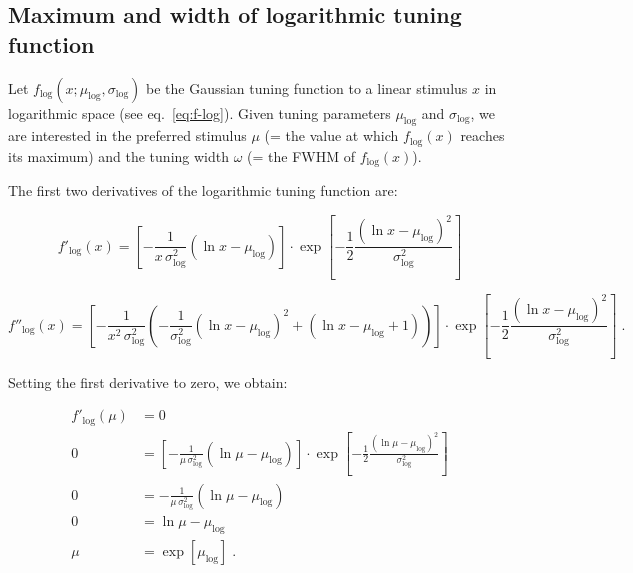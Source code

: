 \documentclass[a4paper,12pt]{article}
\begin{document}
\setcounter{equation}{0}
\subsection{Maximum and width of logarithmic tuning function} \label{sec:App-A}

Let $f_\mathrm{log}(x; \mu_\mathrm{log}, \sigma_\mathrm{log})$ be the Gaussian tuning function to a linear stimulus $x$ in logarithmic space (see eq.~\ref{eq:f-log}). Given tuning parameters $\mu_\mathrm{log}$ and $\sigma_\mathrm{log}$, we are interested in the preferred stimulus $\mu$ (= the value at which $f_\mathrm{log}(x)$ reaches its maximum) and the tuning width $\omega$ (= the FWHM of  $f_\mathrm{log}(x)$).

The first two derivatives of the logarithmic tuning function are:

\begin{equation} \label{eq:df-log}
f'_\mathrm{log}(x) = \left[ -\frac{1}{x \, \sigma_\mathrm{log}^2} (\ln x - \mu_\mathrm{log}) \right] \cdot \exp \left[ -\frac{1}{2} \frac{(\ln x - \mu_\mathrm{log})^2}{\sigma_\mathrm{log}^2} \right]
\end{equation}

\begin{equation} \label{eq:d2f-log}
f''_\mathrm{log}(x) = \left[ -\frac{1}{x^2 \, \sigma_\mathrm{log}^2} \left( -\frac{1}{\sigma_\mathrm{log}^2} (\ln x - \mu_\mathrm{log})^2 + (\ln x - \mu_\mathrm{log} +1) \right) \right] \cdot \exp \left[ -\frac{1}{2} \frac{(\ln x - \mu_\mathrm{log})^2}{\sigma_\mathrm{log}^2} \right] \; .
\end{equation}

Setting the first derivative to zero, we obtain:

\vspace{-0.5em}
\begin{equation} \label{eq:mu-qed}
\begin{split}
f'_\mathrm{log}(\mu) &= 0 \\
0 &= \left[ -\frac{1}{\mu \, \sigma_\mathrm{log}^2} (\ln \mu - \mu_\mathrm{log}) \right] \cdot \exp \left[ -\frac{1}{2} \frac{(\ln \mu - \mu_\mathrm{log})^2}{\sigma_\mathrm{log}^2} \right] \\
0 &= -\frac{1}{\mu \, \sigma_\mathrm{log}^2} (\ln \mu - \mu_\mathrm{log}) \\
0 &= \ln \mu - \mu_\mathrm{log} \\
\mu &= \exp \left[ \mu_\mathrm{log} \right] \; .
\end{split}
\end{equation}
\end{document}
